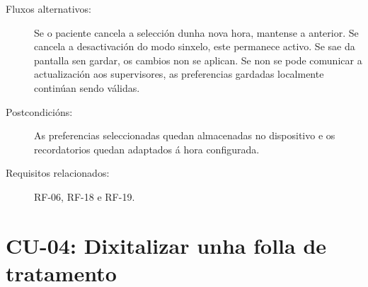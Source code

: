 \begin{description}
\item[Fluxos alternativos:] Se o paciente cancela a selección dunha nova hora,
mantense a anterior. Se cancela a desactivación do modo sinxelo, este permanece
activo. Se sae da pantalla sen gardar, os cambios non se aplican. Se non se pode
comunicar a actualización aos supervisores, as preferencias gardadas localmente
continúan sendo válidas.

\item[Postcondicións:] As preferencias seleccionadas quedan almacenadas no
dispositivo e os recordatorios quedan adaptados á hora configurada.

\item[Requisitos relacionados:] RF-06, RF-18 e RF-19.

\end{description}



\section{CU-04: Dixitalizar unha folla de tratamento}
\label{cu:dixitalizar-folla}

